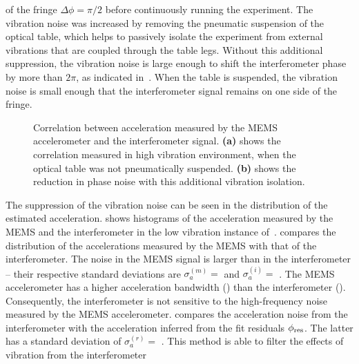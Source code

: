 of the fringe \(\Delta \phi = \pi/2\) before continuously running the
experiment. The vibration noise was increased
by removing the pneumatic suspension of the optical table, which
helps to passively isolate the experiment from external vibrations
that are coupled through the table legs. Without this additional
suppression, the vibration noise is large enough to shift the
interferometer phase by more than \(2\pi\), as indicated
in~. When the table is suspended, the
vibration noise is small enough that the interferometer signal remains
on one side of the fringe.
\begin{figure}[htpb!]
  \centering
  \caption[Comparison of MEMS/Interferometer correlation in a high and
    low vibration
  environments.]{Correlation between acceleration measured by the MEMS
    accelerometer and the interferometer signal. \textbf{(a)} shows
    the correlation measured in high vibration environment, when the
    optical table was not pneumatically suspended. \textbf{(b)} shows
    the reduction in phase noise with this additional vibration
  isolation.}
  \label{fig:vib_comparison}
\end{figure}
\par\noindent
The suppression of the vibration noise can be seen in the distribution
of the estimated acceleration.  shows
histograms of the acceleration measured by the MEMS and the
interferometer in the low vibration instance
of~.  compares the distribution of
the accelerations measured by the MEMS with that of the
interferometer. The noise in the MEMS signal is larger than in the
interferometer -- their respective standard deviations are
$\sigma_a^{(m)} =$  and
$\sigma_a^{(i)} =$ . The MEMS
accelerometer has a higher acceleration bandwidth () than the
interferometer (). Consequently, the interferometer
is not sensitive to the high-frequency noise measured by the MEMS
accelerometer.  compares the acceleration noise
from the interferometer with the acceleration inferred from the fit
residuals
$\phi_\textnormal{res}$. The latter has a standard deviation of
$\sigma_a^{(r)} = $ . This method is
able to filter the effects of vibration from the interferometer
